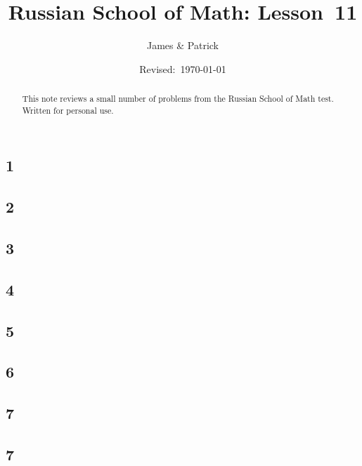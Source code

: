 \documentclass[12pt]{article}
\title{Russian School of Math: Lesson~11}
\author{James \& Patrick}
\date{Revised:~\today}
\begin{document}
\maketitle
\begin{abstract}\setlength{\parindent}{0pt}%
This note reviews a small number of problems from the Russian School of Math test. Written for personal use.
\end{abstract}

\thispagestyle{empty}
\clearpage

\subsection*{1}

\begin{solution}
  
\end{solution}

\subsection*{2}

\begin{solution}
  
\end{solution}

\subsection*{3}

\begin{solution}
  
\end{solution}

\subsection*{4}

\begin{solution}
  
\end{solution}

\subsection*{5}

\begin{solution}
  
\end{solution}

\subsection*{6}

\begin{solution}
  
\end{solution}

\subsection*{7}

\begin{solution}
  
\end{solution}

\subsection*{7}

\begin{solution}
  
\end{solution}
\end{document}
